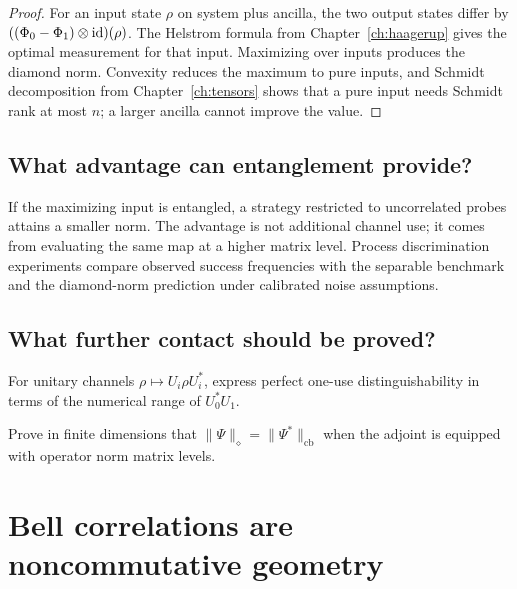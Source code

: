 \begin{proof}
For an input state $\rho$ on system plus ancilla, the two output states differ
by $((\Phi_0-\Phi_1)\otimes\operatorname{id})(\rho)$.  The Helstrom formula from
Chapter~\ref{ch:haagerup} gives the optimal measurement for that input.
Maximizing over inputs produces the diamond norm.  Convexity reduces the
maximum to pure inputs, and Schmidt decomposition from Chapter~\ref{ch:tensors}
shows that a pure input needs Schmidt rank at most $n$; a larger ancilla cannot
improve the value.
\end{proof}

\section{What advantage can entanglement provide?}

If the maximizing input is entangled, a strategy restricted to uncorrelated
probes attains a smaller norm.  The advantage is not additional channel use;
it comes from evaluating the same map at a higher matrix level.  Process
discrimination experiments compare observed success frequencies with the
separable benchmark and the diamond-norm prediction under calibrated noise
assumptions.

\section{What further contact should be proved?}

\begin{exercise}
For unitary channels $\rho\mapsto U_i\rho U_i^*$, express perfect one-use
distinguishability in terms of the numerical range of $U_0^*U_1$.
\end{exercise}

\begin{exercise}
Prove in finite dimensions that
$\|\Psi\|_\diamond=\|\Psi^*\|_{\mathrm{cb}}$ when the adjoint is equipped
with operator norm matrix levels.
\end{exercise}


\chapter{Bell correlations are noncommutative geometry}
\label{ch:bell}


